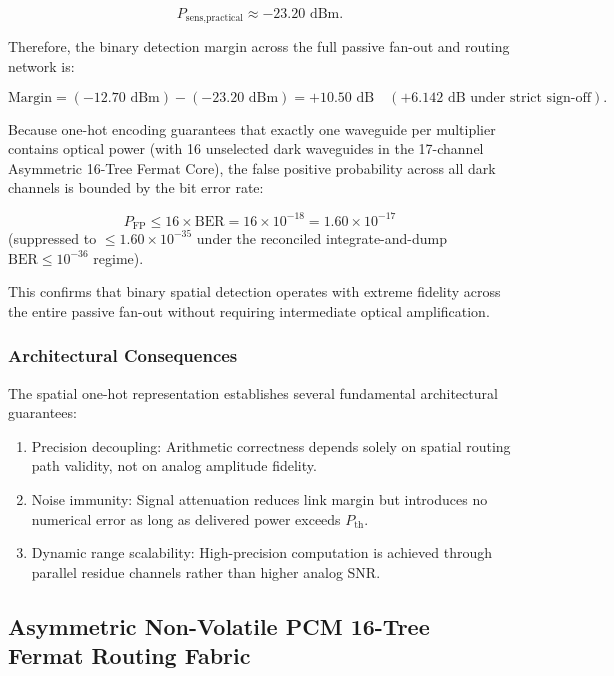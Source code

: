 \documentclass[journal]{IEEEtran}
\begin{document}
\begin{equation}
P_{\text{sens,practical}} \approx -23.20\text{ dBm}.
\end{equation}

Therefore, the binary detection margin across the full passive fan-out and routing network is:

\begin{equation}
\text{Margin} = (-12.70\text{ dBm}) - (-23.20\text{ dBm}) = +10.50\text{ dB} \quad (+6.142\text{ dB under strict sign-off}).
\end{equation}

Because one-hot encoding guarantees that exactly one waveguide per multiplier contains optical power (with 16 unselected dark waveguides in the 17-channel Asymmetric 16-Tree Fermat Core), the false positive probability across all dark channels is bounded by the bit error rate:

\begin{equation}
P_{\mathrm{FP}} \le 16 \times \mathrm{BER} = 16 \times 10^{-18} = 1.60 \times 10^{-17}
\end{equation}
(suppressed to $\le 1.60 \times 10^{-35}$ under the reconciled integrate-and-dump $\mathrm{BER} \le 10^{-36}$ regime).

This confirms that binary spatial detection operates with extreme fidelity across the entire passive fan-out without requiring intermediate optical amplification.

\subsubsection{\textbf{Architectural Consequences}}

The spatial one-hot representation establishes several fundamental architectural guarantees:

\begin{enumerate}
\item Precision decoupling: Arithmetic correctness depends solely on spatial routing path validity, not on analog amplitude fidelity.
\item Noise immunity: Signal attenuation reduces link margin but introduces no numerical error as long as delivered power exceeds $P_{\mathrm{th}}$.
\item Dynamic range scalability: High-precision computation is achieved through parallel residue channels rather than higher analog SNR.
\end{enumerate}

\subsection{\textbf{Asymmetric Non-Volatile PCM 16-Tree Fermat Routing Fabric}}
\end{document}
